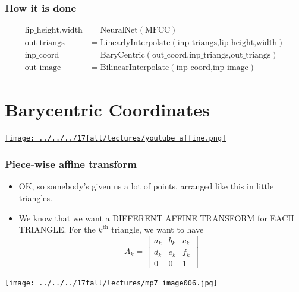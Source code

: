 \documentclass{beamer}
\begin{document}
\begin{frame}
  \frametitle{How it is done}
    \begin{align*}
      \mbox{lip\_height,width} &= \mbox{NeuralNet}\left(\mbox{MFCC}\right)\\
      \mbox{out\_triangs} &= \mbox{LinearlyInterpolate}\left(\mbox{inp\_triangs,lip\_height,width}\right)\\
      \mbox{inp\_coord} &= \mbox{BaryCentric}\left(\mbox{out\_coord,inp\_triangs,out\_triangs}\right)\\
      \mbox{out\_image} &= \mbox{BilinearInterpolate}\left(\mbox{inp\_coord,inp\_image}\right)
    \end{align*}
\end{frame}

\section{Barycentric Coordinates}
\setcounter{subsection}{1}

\begin{frame}
  \centerline{\href{https://www.youtube.com/watch?v=il6Z5LCykZk}{\texttt{[image: ../../../17fall/lectures/youtube\_affine.png]}}}
\end{frame}

\begin{frame}
  \frametitle{Piece-wise affine transform}
  \begin{itemize}
    \item OK, so somebody's given us a lot of points, arranged like
      this in little triangles.
    \item We know that we want a DIFFERENT AFFINE TRANSFORM for EACH
      TRIANGLE.  For the $k^{\textrm{th}}$ triangle, we want to have
      \[
      A_k = \left[\begin{array}{ccc}a_k&b_k&c_k\\d_k&e_k&f_k\\0&0&1\end{array}\right]
      \]
  \end{itemize}
  \centerline{\texttt{[image: ../../../17fall/lectures/mp7\_image006.jpg]}}
\end{frame}
\end{document}
